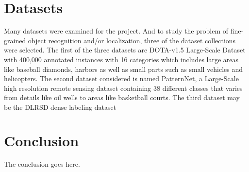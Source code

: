 \documentclass[10pt,journal,onecolumn]{IEEEtran}
\begin{document}
% 
%
%

\section{Datasets}
Many datasets were examined for the project. And to study the problem of fine-grained object recognition and/or localization, three of the dataset collections were selected. The first of the three datasets are DOTA-v1.5 Large-Scale Dataset with 400,000 annotated instances with 16 categories which includes large areas like baseball diamonds, harbors as well as small parts such as small vehicles and helicopters. The second dataset considered is named PatternNet, a Large-Scale high resolution remote sensing dataset containing 38 different classes that varies from details like oil wells to areas like basketball courts. The third dataset may be the DLRSD dense labeling dataset


\section{Conclusion}
The conclusion goes here.










\end{document}
